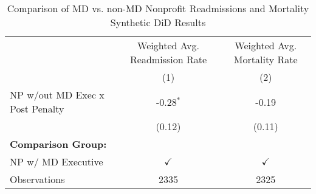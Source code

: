 \begin{table}[ht!]

\caption{\label{tab:MD_noMD_synth}Comparison of MD vs. non-MD Nonprofit Readmissions and Mortality Synthetic DiD Results}
\centering
\begin{tabular}[t]{lcc}
\toprule
\multicolumn{1}{c}{ } & \multicolumn{1}{c}{Weighted Avg. Readmission Rate} & \multicolumn{1}{c}{Weighted Avg. Mortality Rate} \\
\cmidrule(l{3pt}r{3pt}){2-2} \cmidrule(l{3pt}r{3pt}){3-3}
 & (1) & (2)\\
\midrule
NP w/out MD Exec x Post Penalty & -0.28$^{*}$ & -0.19\\
 & (0.12) & (0.11)\\
\textbf{Comparison Group:} &  & \\
NP w/ MD Executive & $\checkmark$ & $\checkmark$\\
Observations & 2335 & 2325\\
\bottomrule
\end{tabular}
\end{table}
